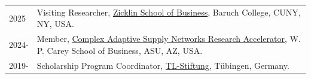 
\begin{longtable}[l]{@{}p{} p{}}

    2025 & Visiting Researcher, \href{https://zicklin.baruch.cuny.edu/}{Zicklin School of Business}, Baruch College, CUNY, NY, USA. \\
    
    2024- & Member, \href{https://supply-networks.wpcarey.asu.edu/}{Complex Adaptive Supply Networks Research Accelerator}, W. P. Carey School of Business, ASU, AZ, USA. \\
    
    2019- & Scholarship Program Coordinator, \href{http://tl-foundation.com/index_e.php}{TL-Stiftung}, Tübingen, Germany. \\

\end{longtable}
